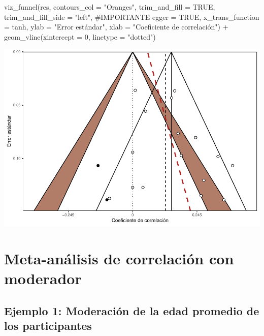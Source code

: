 \documentclass[
  bookmarksnumbered]{article}
\newenvironment{Shaded}{\begin{snugshade}}{\end{snugshade}}
\newcommand{\AttributeTok}[1]{\textcolor[rgb]{0.00,0.34,0.68}{#1}}
\newcommand{\CommentTok}[1]{\textcolor[rgb]{0.54,0.53,0.53}{#1}}
\newcommand{\ConstantTok}[1]{\textcolor[rgb]{0.67,0.33,0.00}{#1}}
\newcommand{\DecValTok}[1]{\textcolor[rgb]{0.69,0.50,0.00}{#1}}
\newcommand{\FunctionTok}[1]{\textcolor[rgb]{0.39,0.29,0.61}{#1}}
\newcommand{\NormalTok}[1]{\textcolor[rgb]{0.12,0.11,0.11}{#1}}
\newcommand{\SpecialCharTok}[1]{\textcolor[rgb]{0.24,0.68,0.91}{#1}}
\newcommand{\StringTok}[1]{\textcolor[rgb]{0.75,0.01,0.01}{#1}}
\begin{document}
\begin{Shaded}
\begin{Highlighting}[]
\FunctionTok{viz\_funnel}\NormalTok{(res, }
           \AttributeTok{contours\_col =} \StringTok{"Oranges"}\NormalTok{,}
           \AttributeTok{trim\_and\_fill =} \ConstantTok{TRUE}\NormalTok{, }
           \AttributeTok{trim\_and\_fill\_side =} \StringTok{"left"}\NormalTok{, }\CommentTok{\#IMPORTANTE}
           \AttributeTok{egger =} \ConstantTok{TRUE}\NormalTok{,}
           \AttributeTok{x\_trans\_function =}\NormalTok{ tanh,}
           \AttributeTok{ylab =} \StringTok{"Error estándar"}\NormalTok{,}
           \AttributeTok{xlab =} \StringTok{"Coeficiente de correlación"}\NormalTok{) }\SpecialCharTok{+}
  \FunctionTok{geom\_vline}\NormalTok{(}\AttributeTok{xintercept =} \DecValTok{0}\NormalTok{, }\AttributeTok{linetype =} \StringTok{"dotted"}\NormalTok{)}
\end{Highlighting}
\end{Shaded}

\includegraphics{Meta-analysis_files/figure-latex/unnamed-chunk-22-1.pdf}

\hypertarget{meta-anuxe1lisis-de-correlaciuxf3n-con-moderador}{%
\section{Meta-análisis de correlación con moderador}\label{meta-anuxe1lisis-de-correlaciuxf3n-con-moderador}}

\hypertarget{ejemplo-1-moderaciuxf3n-de-la-edad-promedio-de-los-participantes}{%
\subsection{Ejemplo 1: Moderación de la edad promedio de los participantes}\label{ejemplo-1-moderaciuxf3n-de-la-edad-promedio-de-los-participantes}}
\end{document}
